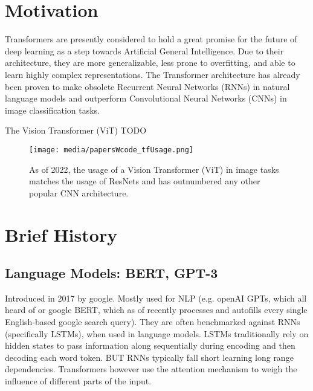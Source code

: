 
\section{Motivation}

Transformers are presently considered to hold a great promise for the future of deep learning
as a step towards Artificial General Intelligence.
Due to their architecture, they are more generalizable, less prone to overfitting, and able 
to learn highly complex representations. The Transformer architecture has already been proven 
to make obsolete Recurrent Neural Networks (RNNs) in natural language models and outperform
Convolutional Neural Networks (CNNs) in image classification tasks.

The Vision Transformer (ViT) TODO


\begin{figure}[H]
	\begin{center}
	\texttt{[image: media/papersWcode\_tfUsage.png]}
	\end{center}
	\caption[Usage of ViT in Image Tasks]{As of 2022, the usage of a Vision Transformer (ViT) in image 
	tasks matches the usage of ResNets and has outnumbered any other popular CNN architecture.}
	\end{figure}


\section{Brief History}

\subsection{Language Models: BERT, GPT-3}

Introduced in 2017 by google. Mostly used for NLP (e.g. openAI GPTs, 
which all heard of or google BERT, which as of recently processes 
and autofills every single English-based google search query). 
They are often benchmarked against RNNs (specifically LSTMs), when used in 
language models. LSTMs traditionally rely on hidden states to pass information 
along sequentially during encoding and then decoding each word token. BUT RNNs 
typically fall short learning long range dependencies.
Transformers however use the attention mechanism to weigh the influence of 
different parts of the input.

